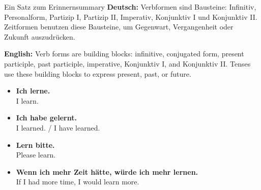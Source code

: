 \documentclass[a4paper,11pt]{article}
\newcommand{\GermanText}[1]{\textbf{Deutsch: }#1\par}
\newcommand{\EnglishText}[1]{{\small\color{SoftGray}\textbf{English: }#1\par}}
\newcommand{\ExampleItem}[2]{\item \textbf{#1}\\{\small\color{SoftGray}#2}}
\begin{document}
\begin{grammarentry}{Ein Satz zum Erinnern}{summary}
\GermanText{Verbformen sind Bausteine: Infinitiv, Personalform, Partizip I, Partizip II, Imperativ, Konjunktiv I und Konjunktiv II. Zeitformen benutzen diese Bausteine, um Gegenwart, Vergangenheit oder Zukunft auszudrücken.}
\EnglishText{Verb forms are building blocks: infinitive, conjugated form, present participle, past participle, imperative, Konjunktiv I, and Konjunktiv II. Tenses use these building blocks to express present, past, or future.}

\begin{exbox}
\begin{itemize}
    \ExampleItem{Ich lerne.}{I learn.}
    \ExampleItem{Ich habe gelernt.}{I learned. / I have learned.}
    \ExampleItem{Lern bitte.}{Please learn.}
    \ExampleItem{Wenn ich mehr Zeit hätte, würde ich mehr lernen.}{If I had more time, I would learn more.}
\end{itemize}
\end{exbox}
\end{grammarentry}
\end{document}
